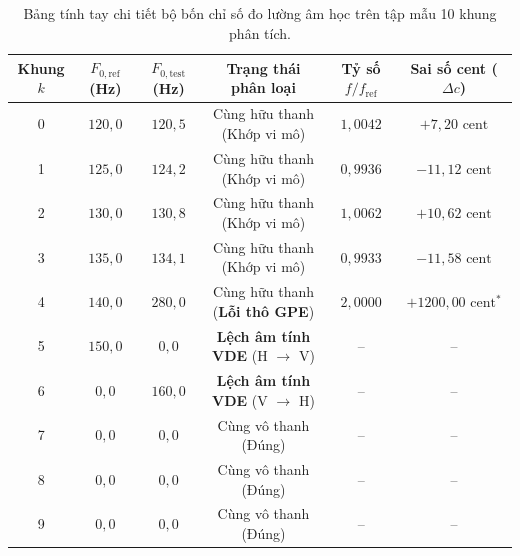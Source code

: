 \begin{table}[htbp]
\centering
\caption{Bảng tính tay chi tiết bộ bốn chỉ số đo lường âm học trên tập mẫu 10 khung phân tích.}
\label{tab:ch13_hand_example}
\small
\begin{tabular}{cccccc}
\toprule
\textbf{Khung $k$} & \textbf{$F_{0,\text{ref}}$ (Hz)} & \textbf{$F_{0,\text{test}}$ (Hz)} & \textbf{Trạng thái phân loại} & \textbf{Tỷ số $f/f_{\text{ref}}$} & \textbf{Sai số cent ($\Delta c$)} \\
\midrule
0 & $120{,}0$ & $120{,}5$ & Cùng hữu thanh (Khớp vi mô) & $1{,}0042$ & $+7{,}20\text{ cent}$ \\
1 & $125{,}0$ & $124{,}2$ & Cùng hữu thanh (Khớp vi mô) & $0{,}9936$ & $-11{,}12\text{ cent}$ \\
2 & $130{,}0$ & $130{,}8$ & Cùng hữu thanh (Khớp vi mô) & $1{,}0062$ & $+10{,}62\text{ cent}$ \\
3 & $135{,}0$ & $134{,}1$ & Cùng hữu thanh (Khớp vi mô) & $0{,}9933$ & $-11{,}58\text{ cent}$ \\
4 & $140{,}0$ & $280{,}0$ & Cùng hữu thanh (\textbf{Lỗi thô GPE}) & $2{,}0000$ & $+1200{,}00\text{ cent}^*$ \\
5 & $150{,}0$ & $0{,}0$ & \textbf{Lệch âm tính VDE} (H $\to$ V) & -- & -- \\
6 & $0{,}0$ & $160{,}0$ & \textbf{Lệch âm tính VDE} (V $\to$ H) & -- & -- \\
7 & $0{,}0$ & $0{,}0$ & Cùng vô thanh (Đúng) & -- & -- \\
8 & $0{,}0$ & $0{,}0$ & Cùng vô thanh (Đúng) & -- & -- \\
9 & $0{,}0$ & $0{,}0$ & Cùng vô thanh (Đúng) & -- & -- \\
\bottomrule
\end{tabular}
\end{table}

